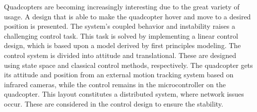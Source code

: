 Quadcopters are becoming increasingly interesting due to the great variety of usage. A design that is able to make the quadcopter hover and move to a desired position is presented. The system’s coupled behavior and instability raises a challenging control task. This task is solved by implementing a linear control design, which is based upon a model derived by first principles modeling. The control system is divided into attitude and translational. These are designed using state space and classical control methods, respectively. The quadcopter gets its attitude and position from an external motion tracking system based on infrared cameras, while the control remains in the microcontroller on the quadcopter. This layout constitutes a distributed system, where network issues occur. These are considered in the control design to ensure the stability.